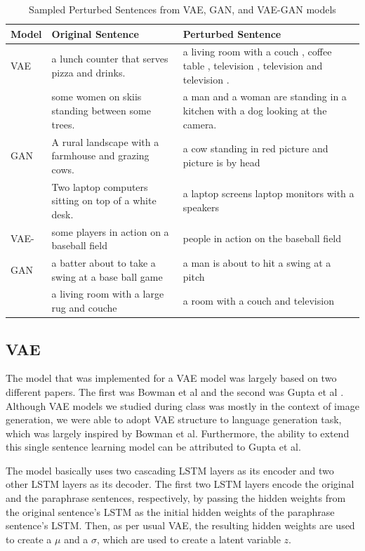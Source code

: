 \documentclass{article}
\begin{document}
\begin{table}[t]
    \small
    \centering
    \begin{tabular}{p{0.8cm}p{5.5cm}p{5.5cm}}
        \toprule
            Model & Original Sentence & Perturbed Sentence \\
        \midrule
            VAE &  a lunch counter that serves pizza and drinks. & a living room with a couch , coffee table , television , television and television .\\
            & some women on skiis standing between some trees. & a man and a woman are standing in a kitchen with a dog looking at the camera.\\
          
        \midrule
            GAN & A rural landscape with a farmhouse and grazing cows. & a cow standing in red picture and picture is by head \\
            & Two laptop computers sitting on top of a white desk. & a laptop screens laptop monitors with a speakers\\
            
        \midrule
            VAE- & some players in action on a baseball field & people in action on the baseball field \\
            GAN & a batter about to take a swing at a base ball game & a man is about to hit a swing at a pitch \\
            & a living room with a large rug and couche & a room with a couch and television\\
        \bottomrule
    \end{tabular}
    \label{tab:qual}
    \caption{Sampled Perturbed Sentences from VAE, GAN, and VAE-GAN models}
\end{table}


\subsection{VAE}
The model that was implemented for a VAE model was largely based on two different papers. The first was Bowman et al \cite{bowman2015generating} and the second was Gupta et al \cite{gupta2017deep}. Although VAE models we studied during class was mostly in the context of image generation, we were able to adopt VAE structure to language generation task, which was largely inspired by Bowman et al. Furthermore, the ability to extend this single sentence learning model can be attributed to Gupta et al. 

The model basically uses two cascading LSTM layers as its encoder and two other LSTM layers as its decoder. The first two LSTM layers encode the original and the paraphrase sentences, respectively, by passing the hidden weights from the original sentence's LSTM as the initial hidden weights of the paraphrase sentence's LSTM. Then, as per usual VAE, the resulting hidden weights are used to create a $\mu$ and a $\sigma$, which are used to create a latent variable $z$. 
\end{document}
